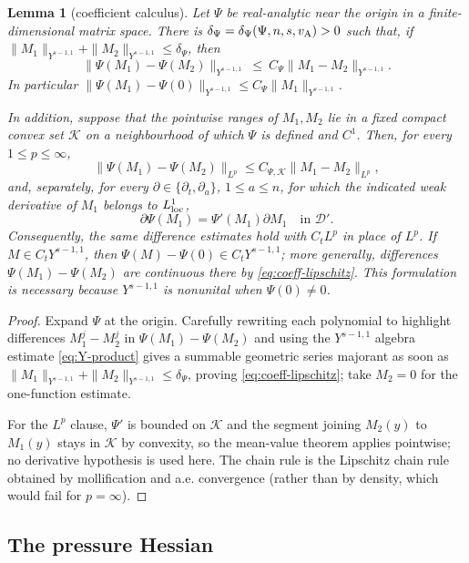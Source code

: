 \documentclass[11pt,reqno]{amsart}
\theoremstyle{plain}
\newtheorem{lemma}[theorem]{Lemma}
\theoremstyle{definition}
\theoremstyle{remark}
\numberwithin{equation}{section}
\begin{document}
\begin{lemma}[coefficient calculus]\label{lem:coeff-calculus}
Let $\Psi$ be real-analytic near the origin in a finite-dimensional matrix space. There is
$\delta_\Psi=\delta_\Psi(\Psi,n,s,v_{\rm A})>0$ such that, if
$\|M_1\|_{Y^{s-1,1}}+\|M_2\|_{Y^{s-1,1}}\le\delta_\Psi$, then
\begin{equation*}\tag{P}\label{eq:coeff-lipschitz}
\|\Psi(M_1)-\Psi(M_2)\|_{Y^{s-1,1}}
\ \le\ C_\Psi\|M_1-M_2\|_{Y^{s-1,1}}.
\end{equation*}
In particular
$\|\Psi(M_1)-\Psi(0)\|_{Y^{s-1,1}}\le C_\Psi\|M_1\|_{Y^{s-1,1}}$.

In addition, suppose that the pointwise ranges of $M_1,M_2$ lie in a fixed
compact convex set $\mathscr K$ on a neighbourhood of which $\Psi$ is defined and
$C^1$.  Then, for every $1\le p\le\infty$,
\[
\|\Psi(M_1)-\Psi(M_2)\|_{L^p}\le C_{\Psi,\mathscr K}\|M_1-M_2\|_{L^p},
\]
and, separately, for every $\partial\in\{\partial_t,\partial_a\}$, $1\le a\le n$,
for which the indicated weak derivative of $M_1$ belongs to $L^1_{\rm loc}$,
\[
\partial\Psi(M_1)=\Psi'(M_1)\partial M_1\quad\text{in }\mathcal D'.
\]
Consequently, the same difference estimates hold with $C_tL^p$ in place of
$L^p$. If $M\in C_tY^{s-1,1}$, then
$\Psi(M)-\Psi(0)\in C_tY^{s-1,1}$; more generally, differences
$\Psi(M_1)-\Psi(M_2)$ are continuous there by
\eqref{eq:coeff-lipschitz}. This formulation is necessary because
$Y^{s-1,1}$ is nonunital when $\Psi(0)\ne0$.
\end{lemma}

\begin{proof}
Expand $\Psi$ at the origin.  Carefully rewriting each polynomial to highlight differences $M_1^j-M_2^j$ in
$\Psi(M_1)-\Psi(M_2)$ and using the $Y^{s-1,1}$ algebra estimate \eqref{eq:Y-product} gives a summable geometric series majorant as soon as
$\|M_1\|_{Y^{s-1,1}}+\|M_2\|_{Y^{s-1,1}}\le\delta_\Psi$, proving \eqref{eq:coeff-lipschitz}; take $M_2=0$ for the one-function estimate.

For the $L^p$ clause, $\Psi'$ is bounded on $\mathscr K$ and the segment joining
$M_2(y)$ to $M_1(y)$ stays in $\mathscr K$ by convexity, so the mean-value
theorem applies pointwise; no derivative hypothesis is used here.  The
chain rule is the Lipschitz chain rule obtained by mollification and a.e. convergence (rather than by density, which would fail for $p=\infty$).
\end{proof}

\subsection{The pressure Hessian}
\label{ssec:pressure-hessian}
\end{document}
